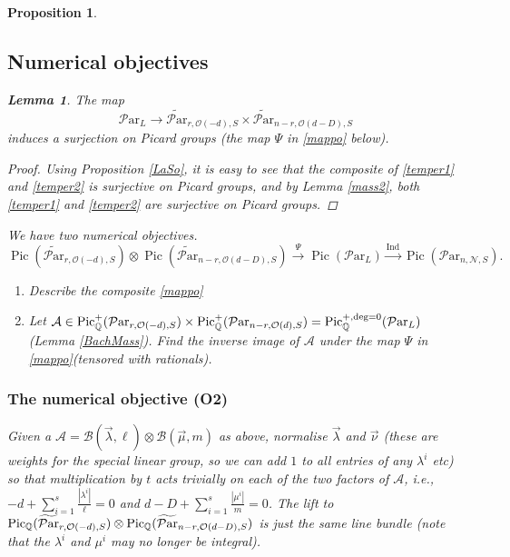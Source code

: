 \documentclass[11pt]{amsart}
\newcommand\op{\operatorname}
\newcommand\Pic{\operatorname{Pic}}
\newcommand\tensor{\otimes}
\newcommand\mn{\mathcal{N}}
\newcommand\ParL{\mathcal{P}\text{ar}_L}
\newcommand\Par{\mathcal{P}\text{ar} }
\newcommand{\leto}[1]{\stackrel{#1}{\to}}
\newtheorem{proposition}[theorem]{Proposition}
\newtheorem{lemma}[theorem]{Lemma}
\numberwithin{theorem}{subsection}
\begin{document}
{\begin{proposition}
\subsection{Numerical objectives}
\begin{lemma}
The map
\begin{equation}\label{temper1}
 \ParL\to \widetilde{\Par}_{r,\mathcal{O}(-d),S}\times \widetilde{\Par}_{n-r,\mathcal{O}(d-D),S}
 \end{equation}
 induces a surjection on Picard groups (the map $\Psi$ in \eqref{mappo} below).
 \end{lemma}
 \begin{proof}
 Using Proposition  \eqref{LaSo}, it is easy to see that the composite of \eqref{temper1} and \eqref{temper2} is surjective on Picard groups, and by Lemma \ref{mass2}, both  \eqref{temper1} and \eqref{temper2} are surjective on Picard groups.
  \end{proof}
 We have two numerical objectives.
\begin{equation}\label{mappo}
\Pic (\widetilde{\Par}_{r,\mathcal{O}(-d),S})\tensor  \Pic (\widetilde{\Par}_{n-r,\mathcal{O}(d-D),S})\leto{\Psi} \Pic(\ParL)\leto{\op{Ind}}  \Pic(\Par_{n,\mn,S}).
\end{equation}
\begin{enumerate}
\item[(O1)] Describe the composite \eqref{mappo}
\item[(O2)] Let  $\mathcal{A}\in\Pic^+_{\Bbb{Q}}(\Par_{r,\mathcal{O}(-d),S})\times \Pic^+_{\Bbb{Q}}(\Par_{n-r,\mathcal{O}(d),S})=\Pic^{+,\deg=0}_{\Bbb{Q}}(\ParL)$ (Lemma \ref{BachMass}). Find the inverse image of $\mathcal{A}$  under the map $\Psi$ in \eqref{mappo}(tensored with rationals).
\end{enumerate}
\subsubsection{The numerical objective (O2)}
Given a  $\mathcal{A}=\mathcal{B}(\vec{\lambda},\ell)\tensor\mathcal{B}(\vec{\mu},m)$  as above, normalise $\vec{\lambda}$ and $\vec{\nu}$ (these are weights for the special linear group, so we can add $1$ to all entries of any $\lambda^i$ etc)
so that multiplication by $t$ acts trivially on each of the two factors of $\mathcal{A}$, i.e.,
$-d+ \sum_{i=1}^s \frac{|\lambda^i|}{\ell}=0$ and $d-D +\sum_{i=1}^s\frac{|\mu^i|}{m}=0$. The lift
to $\Pic_{\Bbb{Q}} (\widetilde{\Par}_{r,\mathcal{O}(-d),S})\tensor  \Pic_{\Bbb{Q}}(\widetilde{\Par}_{n-r,\mathcal{O}(d-D),S})$ is just the same line bundle (note that the $\lambda^i$ and $\mu^i$ may no longer be integral).

\end{proposition}}
\end{document}
